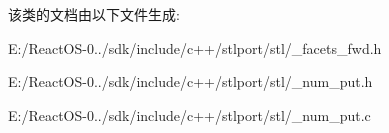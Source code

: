 该类的文档由以下文件生成\+:\begin{DoxyCompactItemize}
\item 
E\+:/\+React\+O\+S-\/0../sdk/include/c++/stlport/stl/\+\_\+facets\+\_\+fwd.\+h\item 
E\+:/\+React\+O\+S-\/0../sdk/include/c++/stlport/stl/\+\_\+num\+\_\+put.\+h\item 
E\+:/\+React\+O\+S-\/0../sdk/include/c++/stlport/stl/\+\_\+num\+\_\+put.\+c\end{DoxyCompactItemize}
